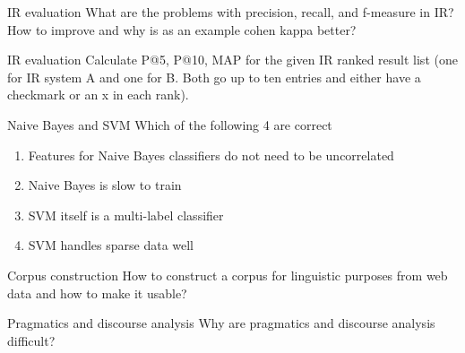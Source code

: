 \documentclass{article}
\begin{document}
\begin{exercise}{IR evaluation}
  What are the problems with precision, recall, and f-measure in IR? How to improve and why is as an example cohen kappa better?

  \begin{solution}
  \end{solution}
\end{exercise}

\begin{exercise}{IR evaluation}
  Calculate P@5, P@10, MAP for the given IR ranked result list (one for IR system A and one for B. Both go up to ten entries and either have a checkmark or an x in each rank).

  \begin{solution}
  \end{solution}
\end{exercise}

\begin{exercise}{Naive Bayes and SVM}
  Which of the following 4 are correct
  \begin{enumerate}
    \item Features for Naive Bayes classifiers do not need to be uncorrelated
    \item Naive Bayes is slow to train
    \item SVM itself is a multi-label classifier
    \item SVM handles sparse data well
  \end{enumerate}

  \begin{solution}
  \end{solution}
\end{exercise}

\begin{exercise}{Corpus construction}
  How to construct a corpus for linguistic purposes from web data and how to make it usable?

  \begin{solution}
  \end{solution}
\end{exercise}

\begin{exercise}{Pragmatics and discourse analysis}
  Why are pragmatics and discourse analysis difficult?

  \begin{solution}
  \end{solution}
\end{exercise}
\end{document}
